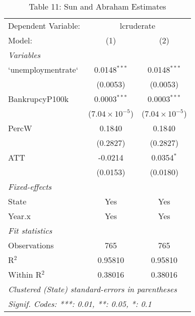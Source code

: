 
\begin{table}[htbp]
   \caption{Table 11: Sun and Abraham Estimates}
   \centering
   \begin{tabular}{lcc}
      \tabularnewline \midrule \midrule
      Dependent Variable: & \multicolumn{2}{c}{lcruderate}\\
      Model:             & (1)                     & (2)\\  
      \midrule
      \emph{Variables}\\
      `unemploymentrate` & 0.0148$^{***}$          & 0.0148$^{***}$\\   
                         & (0.0053)                & (0.0053)\\   
      BankrupcyP100k     & 0.0003$^{***}$          & 0.0003$^{***}$\\   
                         & ($7.04\times 10^{-5}$)  & ($7.04\times 10^{-5}$)\\    
      PercW              & 0.1840                  & 0.1840\\   
                         & (0.2827)                & (0.2827)\\   
      ATT                & -0.0214                 & 0.0354$^{*}$\\   
                         & (0.0153)                & (0.0180)\\   
      \midrule
      \emph{Fixed-effects}\\
      State              & Yes                     & Yes\\  
      Year.x             & Yes                     & Yes\\  
      \midrule
      \emph{Fit statistics}\\
      Observations       & 765                     & 765\\  
      R$^2$              & 0.95810                 & 0.95810\\  
      Within R$^2$       & 0.38016                 & 0.38016\\  
      \midrule \midrule
      \multicolumn{3}{l}{\emph{Clustered (State) standard-errors in parentheses}}\\
      \multicolumn{3}{l}{\emph{Signif. Codes: ***: 0.01, **: 0.05, *: 0.1}}\\
   \end{tabular}
\end{table}


